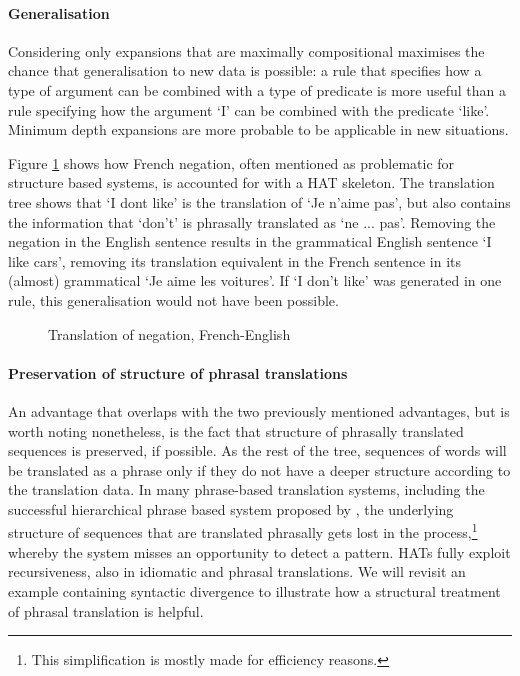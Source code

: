 \paragraph{Generalisation} Considering only expansions that are maximally compositional maximises the chance that generalisation to new data is possible: a rule that specifies how a type of argument can be combined with a type of predicate is more useful than a rule specifying how the argument `I' can be combined with the predicate `like'. Minimum depth expansions are more probable to be applicable in new situations. 

Figure \ref{fig:nepas} shows how French negation, often mentioned as problematic for structure based systems, is accounted for with a HAT skeleton. The translation tree shows that `I dont like' is the translation of `Je n'aime pas', but also contains the information that `don't' is phrasally translated as `ne ... pas'. Removing the negation in the English sentence results in the grammatical English sentence `I like cars', removing its translation equivalent in the French sentence in its (almost) grammatical `Je aime les voitures'. If `I don't like' was generated in one rule, this generalisation would not have been possible.

\begin{figure}[!ht]
\centering

\caption{Translation of negation, French-English}\label{fig:nepas}
\end{figure} 

\paragraph{Preservation of structure of phrasal translations}

An advantage that overlaps with the two previously mentioned advantages, but is worth noting nonetheless, is the fact that structure of phrasally translated sequences is preserved, if possible. As the rest of the tree, sequences of words will be translated as a phrase only if they do not have a deeper structure according to the translation data. In many phrase-based translation systems, including the successful hierarchical phrase based system proposed by \cite{chiang2007hierarchical}, the underlying structure of sequences that are translated phrasally gets lost in the process,\footnote{This simplification is mostly made for efficiency reasons.} whereby the system misses an opportunity to detect a pattern. HATs fully exploit recursiveness, also in idiomatic and phrasal translations. We will revisit an example containing syntactic divergence to illustrate how a structural treatment of phrasal translation is helpful.

